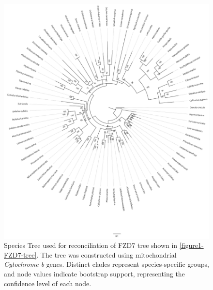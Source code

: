 \documentclass[11pt, a4paper]{article}
\begin{document}
\begin{figure}[h]
    \centering
    \includegraphics[width=0.8\linewidth]{Figures/Cytb_seq-2.aln.contree.png} 
    \caption{Species Tree used for reconciliation of FZD7 tree shown in \autoref{figure1-FZD7-tree}. The tree was constructed using mitochondrial \textit{Cytochrome b} genes. Distinct clades represent species-specific groups, and node values indicate bootstrap support, representing the confidence level of each node.}
    \label{fig:example-image}
\end{figure}
\end{document}
